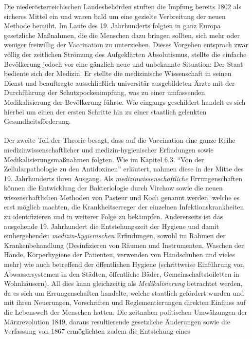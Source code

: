 \documentclass[
    a4paper,
    12pt,
    hyphens,
    chapterprefix=true,
    headheight=33pt,
    footheight=29pt,
    headings=optiontohead,
]{scrartcl}
\begin{document}
{Die niederösterreichischen Landesbehörden stuften die Impfung bereits 1802 als sicheres Mittel ein und waren bald um eine gezielte Verbreitung der neuen Methode bemüht. Im Laufe des 19. Jahrhunderts folgten in ganz Europa gesetzliche Maßnahmen, die die Menschen dazu bringen sollten,
sich mehr oder weniger freiwillig der Vaccination zu unterziehen. Dieses
Vorgehen entsprach zwar völlig der zeitlichen Strömung des Aufgeklärten
Absolutismus, stellte die einfache Bevölkerung jedoch vor eine gänzlich neue
und unbekannte Situation: Der Staat bediente sich der Medizin. Er stellte die medizinische
Wissenschaft in seinen Dienst und beauftragte ausschließlich universitär ausgebildeten Ärzte mit der
Durchführung der Schutzpockenimpfung, was zu einer umfassenden Medikalisierung der Bevölkerung
führte. Wie eingangs geschildert handelt es sich hierbei um einen der ersten Schritte hin zu einer
staatlich gelenkten Gesundheitsförderung.\\
\\
Der zweite Teil der Theorie besagt, dass auf die Vaccination eine ganze Reihe medizinwissenschaftlicher und medizin-hygienischer Erfindungen sowie Medikalisierungsmaßnahmen folgten. Wie im Kapitel 6.3. "`Von der Zellularpathologie zu den Antidoxinen"' erläutert, nahmen diese in der Mitte des 19. Jahrhunderts ihren Ausgang. Als \textit{medizinwissenschaftliche} Errungenschaften können die Entwicklung der Bakteriologie durch Virchow sowie die neuen wissenschaftlichen Methoden von Pasteur und Koch genannt werden, welche es erst möglich machten, die Krankheitserreger der einzelnen Infektionskrankheiten zu identifizieren und in weiterer Folge zu bekämpfen. Andererseits ist das ausgehende 19. Jahrhundert die Entstehungszeit der Hygiene und damit einhergehenden \textit{medizin-hygienischen} Erfindungen, sowohl im Rahmen der Krankenbehandlung (Desinfizieren von Räumen und Instrumenten, Waschen der Hände, Körperhygiene
der Patienten, verwenden von Handschuhen und vieles mehr) wie auch betreffend der öffentlichen Hygiene (schrittweise Einführung von Abwassersystemen in den Städten, öffentliche Bäder,
Gemeinschaftstoiletten in Wohnhäusern). All dies kann gleichzeitig als \textit{Medikalisierung} betrachtet werden, da es sich um Errungenschaften handelte, welche staatlich gefördert wurden und mit ihren Neuerungen, Vorschriften und Reglementierungen direkten Einfluss auf die Lebenswelt der Menschen hatten. Die zeitnahen politischen Umwälzungen der Märzrevolution 1849, daraus resultierende gesetzliche Änderungen sowie die Verfassung von 1867 ermöglichten zudem die Entstehung eines
}
\end{document}
